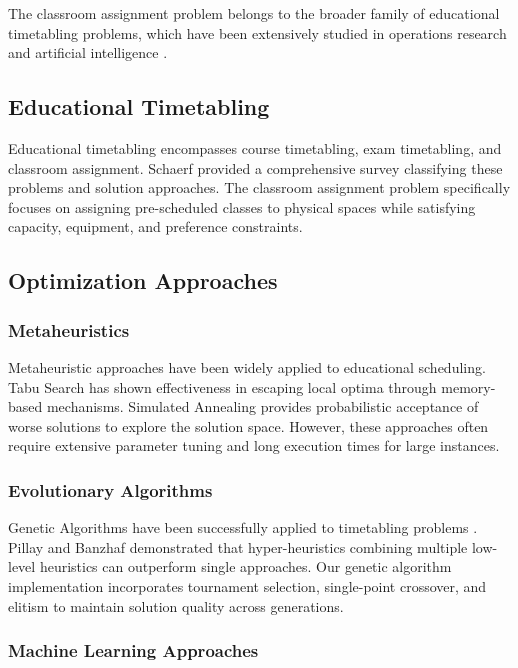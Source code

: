 \documentclass[algorithms,article,submit,pdftex,moreauthors]{Definitions/mdpi}
\begin{document}
The classroom assignment problem belongs to the broader family of educational timetabling problems, which have been extensively studied in operations research and artificial intelligence \citep{ref-schaerf1999,ref-pillay2014}.

\subsection{Educational Timetabling}

Educational timetabling encompasses course timetabling, exam timetabling, and classroom assignment. Schaerf \citep{ref-schaerf1999} provided a comprehensive survey classifying these problems and solution approaches. The classroom assignment problem specifically focuses on assigning pre-scheduled classes to physical spaces while satisfying capacity, equipment, and preference constraints.

\subsection{Optimization Approaches}

\subsubsection{Metaheuristics}

Metaheuristic approaches have been widely applied to educational scheduling. Tabu Search \citep{ref-alvarez2002} has shown effectiveness in escaping local optima through memory-based mechanisms. Simulated Annealing \citep{ref-abramson1999} provides probabilistic acceptance of worse solutions to explore the solution space. However, these approaches often require extensive parameter tuning and long execution times for large instances.

\subsubsection{Evolutionary Algorithms}

Genetic Algorithms have been successfully applied to timetabling problems \citep{ref-colorni1998}. Pillay and Banzhaf \citep{ref-pillay2010} demonstrated that hyper-heuristics combining multiple low-level heuristics can outperform single approaches. Our genetic algorithm implementation incorporates tournament selection, single-point crossover, and elitism to maintain solution quality across generations.

\subsubsection{Machine Learning Approaches}
\end{document}
